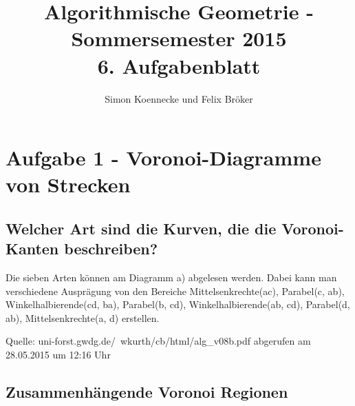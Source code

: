 \documentclass[a4paper]{article}
\begin{document}
\title{Algorithmische Geometrie - Sommersemester 2015\\
       6. Aufgabenblatt }
\author{Simon Koennecke und Felix Bröker}
\date{}
\maketitle

\section*{Aufgabe 1 - Voronoi-Diagramme von Strecken}

\subsection*{Welcher Art sind die Kurven, die die Voronoi-Kanten beschreiben?}

Die sieben Arten können am Diagramm a) abgelesen werden. Dabei kann man verschiedene Ausprägung von den Bereiche Mittelsenkrechte(ac), Parabel(c, ab), Winkelhalbierende(cd, ba), Parabel(b, cd), Winkelhalbierende(ab, cd), Parabel(d, ab), Mittelsenkrechte(a, d) erstellen.
\begin{figure} [!htb] 
\end{figure} 
Quelle: uni-forst.gwdg.de/~wkurth/cb/html/alg\_v08b.pdf abgerufen am 28.05.2015 um 12:16 Uhr

\subsection*{Zusammenhängende Voronoi Regionen}
\end{document}
